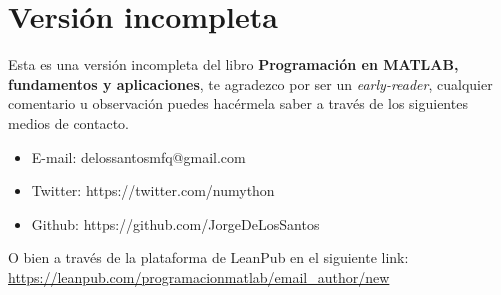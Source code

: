 \chapter*{Versión incompleta}

Esta es una versión incompleta del libro \textbf{Programación en MATLAB,
fundamentos y aplicaciones}, te agradezco por ser un
\emph{early-reader}, cualquier comentario u observación puedes hacérmela
saber a través de los siguientes medios de contacto.

\begin{itemize}
\item E-mail: delossantosmfq@gmail.com
\item Twitter: https://twitter.com/numython
\item Github: https://github.com/JorgeDeLosSantos
\end{itemize}

O bien a través de la plataforma de LeanPub en el siguiente link: \\

\url{https://leanpub.com/programacionmatlab/email_author/new}